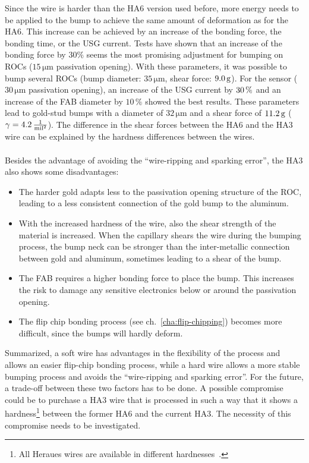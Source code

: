 Since the wire is harder than the HA6 version used before, more energy needs to be applied to the bump to achieve the same amount of deformation as for the HA6. This increase can be achieved by an increase of the bonding force, the bonding time, or the \ac{USG} current. Tests have shown that an increase of the bonding force by $30\%$ seems the most promising adjustment for bumping on \acs{ROC}s ($15\,\si{\micro \meter}$ passivation opening). With these parameters, it was possible to bump several \acs{ROC}s (bump diameter: $35\,\si{\micro \meter}$, shear force: $9.0\,\rm{g}$). For the sensor ($30\,\si{\micro \meter}$ passivation opening), an increase of the \ac{USG} current by $30\,\rm{\%}$ and an increase of the \ac{FAB} diameter by $10\, \%$ showed the best results. These parameters lead to gold-stud bumps with a diameter of $32\,\si{\micro \meter}$ and a shear force of $11.2\,\rm{g}$ ($\gamma=4.2\,\frac{1}{\rm{mil^2}}$). The difference in the shear forces between the HA6 and the HA3 wire can be explained by the hardness differences between the wires.\\
\\Besides the advantage of avoiding the ``wire-ripping and sparking error'', the HA3 also shows some disadvantages:
\begin{itemize}
\item The harder gold adapts less to the passivation opening structure of the \acs{ROC}, leading to a less consistent connection of the gold bump to the aluminum.
\item With the increased hardness of the wire, also the shear strength of the material is increased. When the capillary shears the wire during the bumping process, the bump neck can be stronger than the inter-metallic connection between gold and aluminum, sometimes leading to a shear of the bump.
\item The \ac{FAB} requires a higher bonding force to place the bump. This increases the risk to damage any sensitive electronics below or around the passivation opening.
\item The flip chip bonding process (see ch.~\ref{cha:flip-chipping}) becomes more difficult, since the bumps will hardly deform.
\end{itemize}
Summarized, a soft wire has advantages in the flexibility of the process and allows an easier flip-chip bonding process, while a hard wire allows a more stable bumping process and avoids the ``wire-ripping and sparking error''. For the future, a trade-off between these two factors has to be done. A possible compromise could be to purchase a HA3 wire that is processed in such a way that it shows a hardness\footnote{All Heraues wires are available in different hardnesses~\cite{Koe14}.} between the former HA6 and the current HA3. The necessity of this compromise needs to be investigated.

